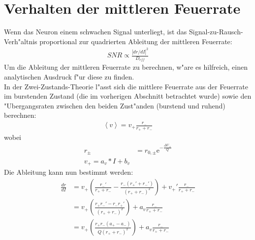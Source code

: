 \documentclass[12pt,a4paper]{article}
\begin{document}
\section{Verhalten der mittleren Feuerrate}
Wenn das Neuron einem schwachen Signal unterliegt, ist das Signal-zu-Rausch-Verh"altnis proportional zur quadrierten Ableitung der mittleren Feuerrate:
\begin{align*}
SNR \propto \frac{|dr/dI|^2}{D_{eff}}
\end{align*}
Um die Ableitung der mittleren Feuerrate zu berechnen, w"are es hilfreich, einen analytischen Ausdruck f"ur diese zu finden.\\
In der Zwei-Zustands-Theorie l"asst sich die mittlere Feuerrate aus der Feuerrate im burstenden Zustand (die im vorherigen Abschnitt betrachtet wurde) sowie den "Ubergangsraten zwischen den beiden Zust"anden (burstend und ruhend) berechnen:
\begin{align*}
\left<v\right>=v_+\frac{r_-}{r_++r_-}
\end{align*}
wobei
\begin{align*}
r_{\pm}&=r_{0,\pm}\text{e}^{-\frac{\Delta U_{\pm}}{Q}}\\
v_+=a_v*I+b_v
\end{align*}
Die Ableitung kann nun bestimmt werden:
\begin{align*}
\frac{dr}{dI}&=v_+\left(\frac{r_-'}{r_++r_-}-\frac{r_-(r_+'+r_-')}{(r_++r_-)^2}\right)+v_+'\frac{r_-}{r_++r_-}\\
&=v_+\left(\frac{r_+r_-'-r_-r_+'}{(r_++r_-)^2}\right)+a_v\frac{r_-}{r_++r_-}\\
&=v_+\left(\frac{r_+r_-(a_+-a_-)}{Q(r_++r_-)^2}\right)+a_v\frac{r_-}{r_++r_-}
\end{align*}
\end{document}
